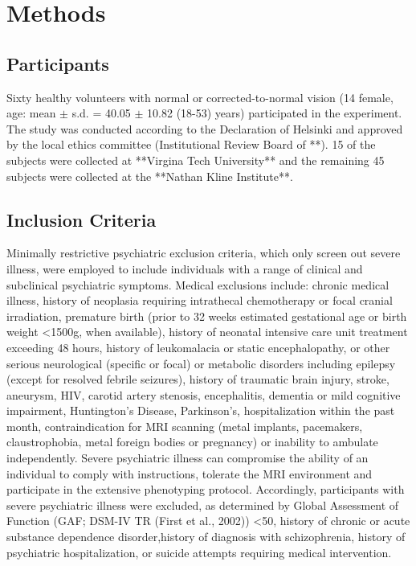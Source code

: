 \section{Methods}

\subsection{Participants}
Sixty healthy volunteers with normal or corrected-to-normal vision (14 female, age: mean $\pm$ s.d. = 40.05 $\pm$ 10.82 (18-53) years) participated in the experiment. The study was conducted according to the Declaration of Helsinki and approved by the local ethics committee (Institutional Review Board of **). 15 of the subjects were collected at **Virgina Tech University** and the remaining 45 subjects were collected at the **Nathan Kline Institute**.

\subsection{Inclusion Criteria}
Minimally restrictive psychiatric exclusion criteria, which only screen out severe illness, were employed to include individuals with a range of clinical and subclinical psychiatric symptoms. Medical exclusions include: chronic medical illness, history of neoplasia requiring intrathecal chemotherapy or focal cranial irradiation, premature birth (prior to 32 weeks estimated gestational age or birth weight \textless 1500g, when available), history of neonatal intensive care unit treatment exceeding 48 hours, history of leukomalacia or static encephalopathy, or other serious neurological (specific or focal) or metabolic disorders including epilepsy (except for resolved febrile seizures), history of traumatic brain injury, stroke, aneurysm, HIV, carotid artery stenosis, encephalitis, dementia or mild cognitive impairment, Huntington's Disease, Parkinson's, hospitalization within the past month, contraindication for MRI scanning (metal implants, pacemakers, claustrophobia, metal foreign bodies or pregnancy) or inability to ambulate independently. Severe psychiatric illness can compromise the ability of an individual to comply with instructions, tolerate the MRI environment and participate in the extensive phenotyping protocol. Accordingly, participants with severe psychiatric illness were excluded, as determined by Global Assessment of Function (GAF; DSM-IV TR (First et al., 2002)) \textless 50, history of chronic or acute substance dependence disorder,history of diagnosis with schizophrenia, history of psychiatric hospitalization, or suicide attempts requiring medical intervention.

